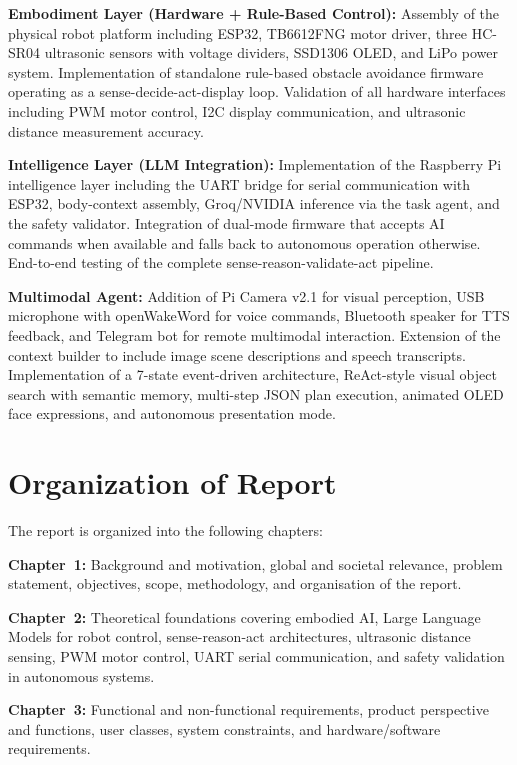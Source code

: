 \textbf{Embodiment Layer (Hardware + Rule-Based Control):} Assembly of the physical robot platform including ESP32, TB6612FNG motor driver, three HC-SR04 ultrasonic sensors with voltage dividers, SSD1306 OLED, and LiPo power system. Implementation of standalone rule-based obstacle avoidance firmware operating as a sense-decide-act-display loop. Validation of all hardware interfaces including PWM motor control, I2C display communication, and ultrasonic distance measurement accuracy.

\textbf{Intelligence Layer (LLM Integration):} Implementation of the Raspberry Pi intelligence layer including the UART bridge for serial communication with ESP32, body-context assembly, Groq/NVIDIA inference via the task agent, and the safety validator. Integration of dual-mode firmware that accepts AI commands when available and falls back to autonomous operation otherwise. End-to-end testing of the complete sense-reason-validate-act pipeline.

\textbf{Multimodal Agent:} Addition of Pi Camera v2.1 for visual perception, USB microphone with openWakeWord for voice commands, Bluetooth speaker for TTS feedback, and Telegram bot for remote multimodal interaction. Extension of the context builder to include image scene descriptions and speech transcripts. Implementation of a 7-state event-driven architecture, ReAct-style visual object search with semantic memory, multi-step JSON plan execution, animated OLED face expressions, and autonomous presentation mode.

\section{Organization of Report}
\label{sec:org}

The report is organized into the following chapters:

\textbf{Chapter~1:} Background and motivation, global and societal relevance, problem statement, objectives, scope, methodology, and organisation of the report.

\textbf{Chapter~2:} Theoretical foundations covering embodied AI, Large Language Models for robot control, sense-reason-act architectures, ultrasonic distance sensing, PWM motor control, UART serial communication, and safety validation in autonomous systems.

\textbf{Chapter~3:} Functional and non-functional requirements, product perspective and functions, user classes, system constraints, and hardware/software requirements.

